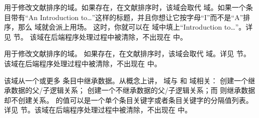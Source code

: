 \begin{fieldlist}
用于修改文献排序的域。如果存在，在文献排序时，该域会取代  域。如果一个条目带有“An Introduction to\dots”这样的标题，并且你想让它按字母“I”而不是“A”排序，那么  域就会派上用场。
这时，你就可以在  域中填上“Introduction to\dots”。详见  节。
该域在后端程序处理过程中被清除，不出现在  中。




用于修改文献排序的域。
如果存在，在文献排序时，该域会取代  域。详见  节。
该域在后端程序处理过程中被清除，不出现在  中。



该域从一个或更多  条目中继承数据。从概念上讲， 域与  和  域相关： 创建一个继承数据的父/子逻辑关系；
 创建一个不继承数据的父/子逻辑关系；而  则继承数据却不创建关系。
 的值可以是一个单个条目关键字或者条目关键字的分隔值列表。
详见  节。该域在后端程序处理过程中被清除，不出现在  中。



\end{fieldlist}
